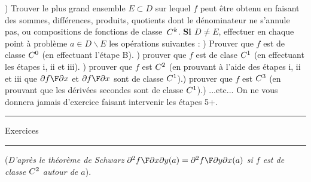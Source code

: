 \bigskip{}) Trouver le plus grand ensemble $E\subset D$ sur lequel $f$ peut \^etre obtenu en faisant des sommes, diff\'erences, produits, quotients dont le d\'enominateur ne s'annule pas, ou compositions de fonctions de classe~$\sc C^k$. 
\medskip\noindent
{\bf Si $D\neq E$}, effectuer en chaque point \`a probl\`eme $a\in D\smallsetminus E$ les op\'erations suivantes : ) Prouver que $f$ est de classe $\sc C^0$ (en effectuant l'\'etape B). ) prouver que $f$ est de clase $\sc C^1$ (en effectuant les \'etapes i, ii et iii). ) prouver que $f$ est $\sc C^2$ (en prouvant \`a l'aide des \'etapes i, ii et iii que ${\partial f\F\partial x}$ et  ${\partial f\F\partial x}$ sont de classe $\sc C^1$).) prouver que $f$ est $\sc C^3$ (en prouvant que les d\'eriv\'ees secondes sont de classe $\sc C^1$).) ...etc...\pn
On ne vous donnera jamais d'exercice faisant intervenir les \'etapes 5+. 
\medskip
\hrule
\centerline{Exercices}
\hrule
\bigskip
{}\par\noindent
({\it D'apr\`es le th\'eor\`eme de Schwarz ${\partial^2f\F\partial x\partial y}(a)={\partial^2f\F\partial y\partial x}(a)$ si $f$ est de classe $\sc C^2$ autour de $a$}).
\goodbreak
{}
\vfill
{}
\vfill
{}
\vfill
{}
\vfill
{}
\vfill
{}
\vfill
{}
\vfill
{}
\vfill
{}
\vfill\null\eject
\bye
